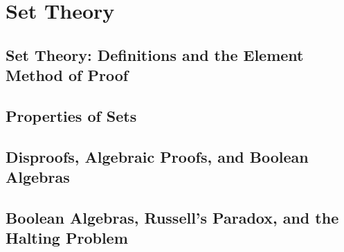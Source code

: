 \section{Set Theory}
\subsection{Set Theory: Definitions and the Element Method of Proof}
\subsection{Properties of Sets}
\subsection{Disproofs, Algebraic Proofs, and Boolean Algebras}
\subsection{Boolean Algebras, Russell's Paradox, and the Halting Problem}